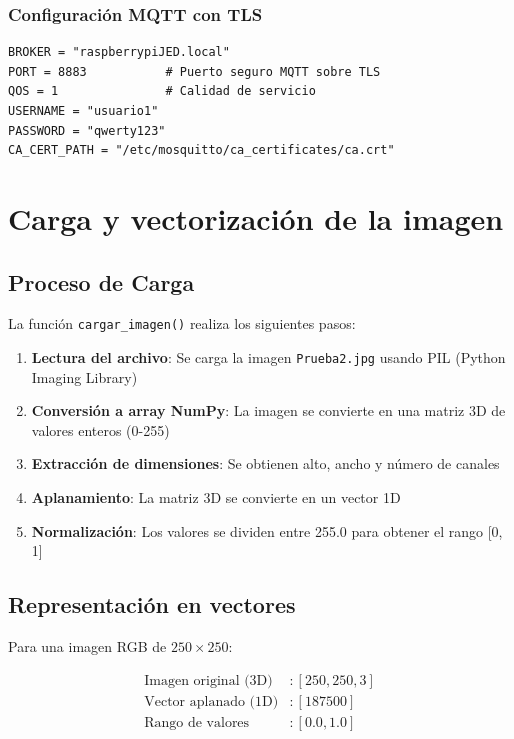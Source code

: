 \documentclass[12pt,a4paper]{article}
\begin{document}
	\subsubsection{Configuración MQTT con TLS}
	
	\begin{lstlisting}
BROKER = "raspberrypiJED.local"
PORT = 8883           # Puerto seguro MQTT sobre TLS
QOS = 1               # Calidad de servicio
USERNAME = "usuario1"
PASSWORD = "qwerty123"
CA_CERT_PATH = "/etc/mosquitto/ca_certificates/ca.crt"
	\end{lstlisting}
	
	\section{Carga y vectorización de la imagen}
	
	\subsection{Proceso de Carga}
	
	La función \texttt{cargar\_imagen()} realiza los siguientes pasos:
	
	\begin{enumerate}
		\item \textbf{Lectura del archivo}: Se carga la imagen \texttt{Prueba2.jpg} usando PIL (Python Imaging Library)
		\item \textbf{Conversión a array NumPy}: La imagen se convierte en una matriz 3D de valores enteros (0-255)
		\item \textbf{Extracción de dimensiones}: Se obtienen alto, ancho y número de canales
		\item \textbf{Aplanamiento}: La matriz 3D se convierte en un vector 1D
		\item \textbf{Normalización}: Los valores se dividen entre 255.0 para obtener el rango [0, 1]
	\end{enumerate}
	
	\subsection{Representación en vectores}
	
	Para una imagen RGB de $250 \times 250$:
	
	\begin{equation}
		\begin{aligned}
			\text{Imagen original (3D)} &: [250, 250, 3] \\
			\text{Vector aplanado (1D)} &: [187500] \\
			\text{Rango de valores} &: [0.0, 1.0]
		\end{aligned}
	\end{equation}
	
\end{document}
